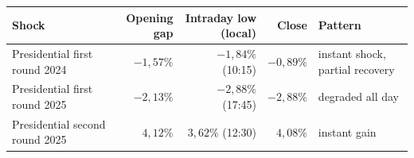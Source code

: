 {\footnotesize\setlength{\tabcolsep}{3.5pt}
\begin{tabular}{p{4.4cm}rrr p{3.4cm}}
\toprule
Shock & Opening gap & Intraday low (local) & Close & Pattern \\
\midrule
Presidential first round 2024 & $-1{,}57\%$ & $-1{,}84\%$ (10:15) & $-0{,}89\%$ & instant shock, partial recovery \\
Presidential first round 2025 & $-2{,}13\%$ & $-2{,}88\%$ (17:45) & $-2{,}88\%$ & degraded all day \\
Presidential second round 2025 & $4{,}12\%$ & $3{,}62\%$ (12:30) & $4{,}08\%$ & instant gain \\
\bottomrule
\end{tabular}}

